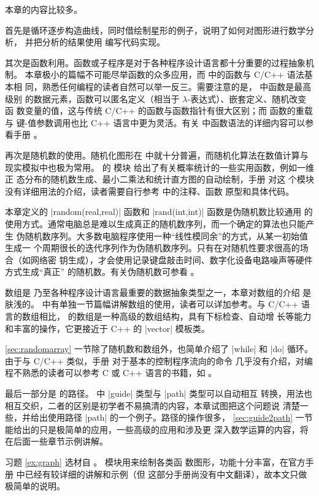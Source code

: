 本章的内容比较多。

首先是循环逐步构造曲线，同时借绘制星形的例子，说明了如何对图形进行数学分析，
并把分析的结果使用 \Asy{} 编写代码实现。

其次是函数利用。函数或子程序是对于各种程序设计语言都十分重要的过程抽象机制。
本章极小的篇幅不可能尽举函数的众多应用，而 \Asy{} 中的函数与 C/C++ 语法基本相
同，熟悉任何编程的读者自然可以举一反三。需要注意的是，\Asy{} 中函数是最高级别
的数据元素，函数可以匿名定义（相当于 $\lambda$-表达式）、嵌套定义、随机改变函
数变量的值，这与传统 C/C++ 的函数与函数指针有很大区别；而 \Asy{} 函数的重载与
键-值参数调用也比 C++ 语言中更为灵活。有关 \Asy{} 中函数语法的详细内容可以参
看手册 \cite{asyman}。

再次是随机数的使用。随机化图形在 \MP{} 中就十分普遍，而随机化算法在数值计算与
现实模拟中也极为常用。\Asy{} 的  模块
 给出了有关概率统计的一些实用函数，例如一维正
态分布的随机数生成、最小二乘法和统计直方图的自动绘制，手册 \cite{asyman} 对这
个模块没有详细用法的介绍，读者需要自行参考  中的注释、函数
原型和具体代码。

本章定义的 |random(real,real)| 函数和 |rand(int,int)| 函数是伪随机数比较通用
的使用方式。通常电脑总是难以生成真正的随机数序列，而一个确定的算法也只能产生
伪随机数序列。大多数电脑程序使用一种“线性模同余”的方式，从某一初始值生成一
个周期很长的迭代序列作为伪随机数序列。只有在对随机性要求很高的场合（如网络密
钥生成），才会使用记录键盘敲击时间、数字化设备电路噪声等硬件方式生成“真正”
的随机数。有关伪随机数可参看 \cite{taocp2}。

数组是 \Asy{} 乃至各种程序设计语言最重要的数据抽象类型之一，本章对数组的介绍
是肤浅的。\cite{asyman} 中有单独一节篇幅讲解数组的使用，读者可以详加参考。与
C/C++ 语言的数组相比，\Asy{} 的数组是一种高级的数组结构，具有下标检查、自动增
长等能力和丰富的操作，它更接近于 C++ 的 |vector| 模板类。

\autoref{sec:randomarray} 一节除了随机数和数组外，也简单介绍了 |while| 和
|do| 循环。由于与 C/C++ 类似，手册 \cite{asyman} 对于基本的控制程序流向的命令
几乎没有介绍，对编程不熟悉的读者可以参考 C 或 C++ 语言的书籍，如 \cite{kandr}
。

最后一部分是 \Asy{} 的路径。\Asy{} 中 |guide| 类型与 |path| 类型可以自动相互
转换，用法也相互交织，二者的区别是初学者不易搞清的内容，本章试图把这个问题说
清楚一些，并给出使用路径 |path| 的一个例子。路径的操作很多，
\autoref{sec:guide2path} 一节能给出的只是极简单的应用，一些高级的应用和涉及更
深入数学运算的内容，将在后面一些章节示例讲解。

习题 \ref{ex:graph} 选材自 \cite{pgfman}。 模块用来绘制各类函
数图形，功能十分丰富，在官方手册 \cite{asyman} 中已经有较详细的讲解和示例（但
这部分手册尚没有中文翻译），故本文只做极简单的说明。

\endinput


